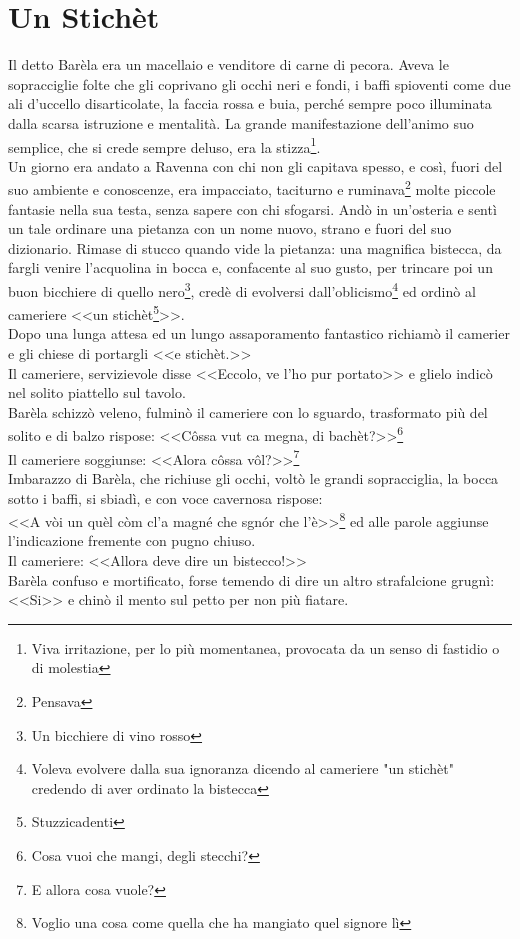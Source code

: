 
\chapter{Un Stichèt}
Il detto Barèla era un macellaio e venditore di carne di pecora. Aveva le sopracciglie folte che gli coprivano gli occhi neri e fondi, i baffi spioventi come due ali d'uccello disarticolate, la faccia rossa e buia, perché sempre poco illuminata dalla scarsa istruzione e mentalità. La grande manifestazione dell'animo suo semplice, che si crede sempre deluso, era la stizza\footnote{Viva irritazione, per lo più momentanea, provocata da un senso di fastidio o di molestia}.\\
\indent Un giorno era andato a Ravenna con chi non gli capitava spesso, e così, fuori del suo ambiente e conoscenze, era impacciato, taciturno e ruminava\footnote{Pensava} molte piccole fantasie nella sua testa, senza sapere con chi sfogarsi. Andò in un'osteria e sentì un tale ordinare una pietanza con un nome nuovo, strano e fuori del suo dizionario. Rimase di stucco quando vide la pietanza: una magnifica bistecca, da fargli venire l'acquolina in bocca e, confacente al suo gusto, per trincare poi un buon bicchiere di quello nero\footnote{Un bicchiere di vino rosso}, credè di evolversi dall'oblicismo\footnote{Voleva evolvere dalla sua ignoranza dicendo al cameriere "un stichèt" credendo di aver ordinato la bistecca} ed ordinò al cameriere <<un stichèt\footnote{Stuzzicadenti}>>. \\
\indent Dopo una lunga attesa ed un lungo assaporamento fantastico richiamò il camerier e gli chiese di portargli <<e stichèt.>>\\
\indent Il cameriere, servizievole disse <<Eccolo, ve l'ho pur portato>> e glielo indicò nel solito piattello sul tavolo.\\
Barèla schizzò veleno, fulminò il cameriere con lo sguardo, trasformato più del solito e di balzo rispose: <<Côssa vut ca megna, di bachèt?>>\footnote{Cosa vuoi che mangi, degli stecchi?}\\
\indent Il cameriere soggiunse: <<Alora côssa vôl?>>\footnote{E allora cosa vuole?}\\
\indent Imbarazzo di Barèla, che richiuse gli occhi, voltò le grandi sopracciglia, la bocca sotto i baffi, si sbiadì, e con voce cavernosa rispose: \\
\indent <<A vòi un quèl còm cl'a magné che sgnór che l'è>>\footnote{Voglio una cosa come quella che ha mangiato quel signore lì} ed alle parole aggiunse l'indicazione fremente con pugno chiuso.\\
\indent Il cameriere: <<Allora deve dire un bistecco!>>\\
Barèla confuso e mortificato, forse temendo di dire un altro strafalcione grugnì: <<Si>> e chinò il mento sul petto per non più fiatare.


